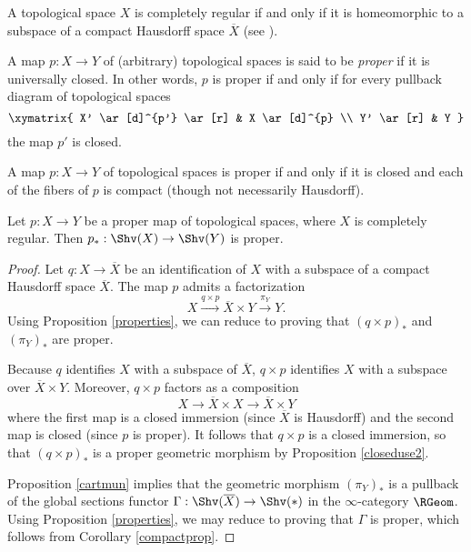 \begin{remark}
A topological space $X$ is completely regular if and only if it is homeomorphic to a subspace of a compact Hausdorff space $\overline{X}$ (see \cite{munkres}).
\end{remark}

\begin{definition}
A map $p: X \rightarrow Y$ of (arbitrary) topological spaces is said to be {\it proper} if it is universally closed. In other words, $p$ is proper if and only if for every pullback diagram of topological spaces
$$ \xymatrix{ X' \ar[d]^{p'} \ar[r] & X \ar[d]^{p} \\
Y' \ar[r] & Y }$$
the map $p'$ is closed.
\end{definition}

\begin{remark}
A map $p: X \rightarrow Y$ of topological spaces is proper 
if and only if it is closed and each of the fibers of $p$ is compact (though not necessarily Hausdorff).
\end{remark}

\begin{theorem}\label{pbct}
Let $p: X \rightarrow Y$ be a proper map of topological spaces, where $X$ is completely regular. Then $p_{\ast}: \Shv(X) \rightarrow \Shv(Y)$ is proper.
\end{theorem}

\begin{proof}
Let $q: X \rightarrow \overline{X}$ be an identification of $X$ with a subspace of a compact Hausdorff space $\overline{X}$. The map $p$ admits a factorization
$$ X \stackrel{q \times p}{\rightarrow}\overline{X} \times Y \stackrel{\pi_{Y}}{\rightarrow} Y.$$
Using Proposition \ref{properties}, we can reduce to proving that $(q \times p)_{\ast}$ and $(\pi_{Y})_{\ast}$ are proper.

Because $q$ identifies $X$ with a subspace of $\overline{X}$, $q \times p$ identifies
$X$ with a subspace over $\overline{X} \times Y$. Moreover, $q \times p$ factors
as a composition 
$$ X \rightarrow \overline{X} \times X \rightarrow \overline{X} \times Y$$
where the first map is a closed immersion (since $\overline{X}$ is Hausdorff) and
the second map is closed (since $p$ is proper). It follows that $q \times p$ is a closed immersion,
so that $(q \times p)_{\ast}$ is a proper geometric morphism by Proposition \ref{closeduse2}.

Proposition \ref{cartmun} implies that the geometric morphism
$(\pi_{Y})_{\ast}$ is a pullback of the global sections functor $\Gamma: \Shv( \overline{X} ) \rightarrow \Shv(\ast)$ in the $\infty$-category $\RGeom$. Using Proposition \ref{properties}, we may reduce to proving that $\Gamma$ is proper, which follows from Corollary \ref{compactprop}.
\end{proof}

